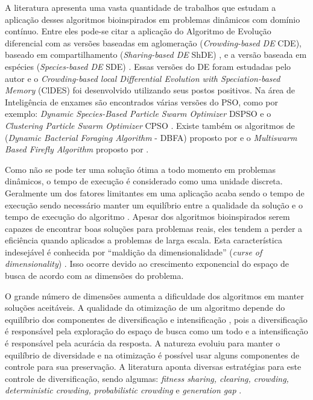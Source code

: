 A literatura apresenta uma vasta quantidade de trabalhos que estudam a aplicação desses algoritmos bioinspirados em problemas dinâmicos com domínio contínuo. Entre eles pode-se citar a aplicação do Algoritmo de Evolução diferencial com as versões baseadas em aglomeração (\textit{Crowding-based DE} CDE), baseado em compartilhamento (\textit{Sharing-based DE} ShDE) \cite{thomsen2004multimodal}, e a versão baseada em espécies (\textit{Species-based DE} SDE) \cite{li2005efficient}. Essas versões do DE foram estudadas pelo autor e o \textit{Crowding-based local Differential Evolution with Speciation-based Memory} (ClDES) foi desenvolvido utilizando seus postos positivos. Na área de Inteligência de enxames são encontrados várias versões do PSO, como por exemplo: \textit{Dynamic Species-Based Particle Swarm Optimizer} DSPSO \cite{parrott2006locating} e o \textit{Clustering Particle Swarm Optimizer} CPSO \cite{yang2010clustering}. Existe também os algoritmos de (\textit{Dynamic Bacterial Foraging Algorithm} - DBFA) proposto por \cite{passino2002biomimicry} e o \textit{Multiswarm Based Firefly Algorithm} proposto por \cite{farahani2011multiswarm}.

Como não se pode ter uma solução ótima a todo momento em problemas dinâmicos, o tempo de execução é considerado como uma unidade discreta. Geralmente um dos fatores limitantes em uma aplicação acaba sendo o tempo de execução sendo necessário manter um equilíbrio entre a qualidade da solução e o tempo de execução do algoritmo \cite{li2006new}. Apesar dos algoritmos bioinspirados serem capazes de encontrar boas soluções para problemas reais, eles tendem a perder a eficiência quando aplicados a problemas de larga escala. Esta característica indesejável é conhecida por “maldição da dimensionalidade” (\textit{curse of dimensionality}) \cite{bellman2015applied}. Isso ocorre devido ao crescimento exponencial do espaço de busca de acordo com as dimensões do problema.

O grande número de dimensões aumenta a dificuldade dos algoritmos em manter soluções aceitáveis. A qualidade da otimização de um algoritmo depende do equilíbrio dos componentes de diversificação e intensificação \cite{boussaid2013survey}, pois a diversificação é responsável pela exploração do espaço de busca como um todo e a intensificação é responsável pela acurácia da resposta. A natureza evoluiu para manter o equilíbrio de diversidade e na otimização é possível usar alguns componentes de controle para sua preservação. A literatura aponta diversas estratégias para este controle de diversificação, sendo algumas: \textit{fitness sharing, clearing, crowding, deterministic crowding, probabilistic crowding} e \textit{generation gap} \cite{andre2015multiple}.

